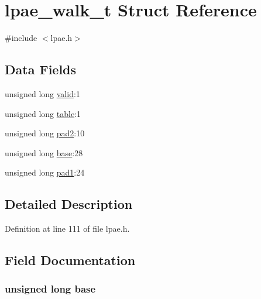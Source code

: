 \hypertarget{structlpae__walk__t}{\section{lpae\-\_\-walk\-\_\-t \-Struct \-Reference}
\label{structlpae__walk__t}
}


{\ttfamily \#include $<$lpae.\-h$>$}

\subsection*{\-Data \-Fields}
\begin{DoxyCompactItemize}
\item 
unsigned long \hyperlink{structlpae__walk__t_a7bcbc21e402fb9e3dc07789d414ef17c}{valid}\-:1
\item 
unsigned long \hyperlink{structlpae__walk__t_afe6d8cf4d4c78126d82831e6d5ef5483}{table}\-:1
\item 
unsigned long \hyperlink{structlpae__walk__t_a3c41899b360fc210cecdadafb8496709}{pad2}\-:10
\item 
unsigned long \hyperlink{structlpae__walk__t_a74f95eab64fb23344e30879684489f6f}{base}\-:28
\item 
unsigned long \hyperlink{structlpae__walk__t_abd440cbf12babccd9a6b85615adb551d}{pad1}\-:24
\end{DoxyCompactItemize}


\subsection{\-Detailed \-Description}


\-Definition at line 111 of file lpae.\-h.



\subsection{\-Field \-Documentation}
\hypertarget{structlpae__walk__t_a74f95eab64fb23344e30879684489f6f}{
\subsubsection[{base}]{\setlength{\rightskip}{0pt plus 5cm}unsigned long {\bf base}}}\label{structlpae__walk__t_a74f95eab64fb23344e30879684489f6f}


